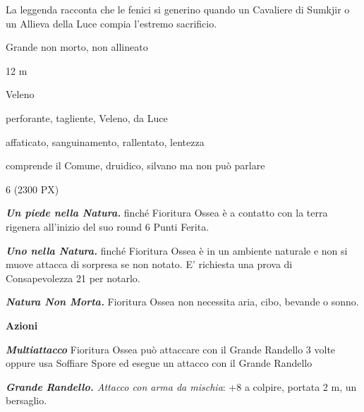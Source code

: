 \begin{multicols}{2}
{La leggenda racconta che le fenici si generino quando un Cavaliere di Sumkjir o un Allieva della Luce compia l'estremo sacrificio.

\begin{description}[noitemsep, topsep=0pt, parsep=0pt, partopsep=0pt, itemsep=1pt, leftmargin=2.35cm,  labelwidth=2.2cm, itemindent=0cm, listparindent=0pt] %
\setlength{\baselineskip}{10pt}
\item[\textbf{Taglia/Tipo}] Grande non morto, non allineato
\item[\textbf{Caratt.}] 
\item[\textbf{Punti Ferita}] 
\item[\textbf{Movimento}] 12 m
\item[\textbf{Tiri Salvez.}] 
\item[\textbf{Imm. Danni}] Veleno
\item[\textbf{Res. Danni}] perforante, tagliente, Veleno, da Luce
\item[\textbf{Immunità}] affaticato, sanguinamento, rallentato, lentezza
\item[\textbf{Sensi}] 
\item[\textbf{Linguaggi}] comprende il Comune, druidico, silvano ma non può parlare
\item[\textbf{Sfida}] 6 (2300 PX)
\end{description}
\smallskip

\emph{\textbf{Un piede nella Natura.}} finché Fioritura Ossea è a contatto con la terra rigenera all'inizio del suo round 6 Punti Ferita.

\emph{\textbf{Uno nella Natura.}} finché Fioritura Ossea è in un ambiente naturale e non si muove attacca di sorpresa se non notato. E' richiesta una prova di Consapevolezza 21 per notarlo.

\emph{\textbf{Natura Non Morta.}} Fioritura Ossea non necessita aria, cibo, bevande o sonno.

\textbf{Azioni}

\emph{\textbf{Multiattacco}} Fioritura Ossea può attaccare con il Grande Randello 3 volte oppure usa Soffiare Spore ed esegue un attacco con il Grande Randello

\emph{\textbf{Grande Randello.} Attacco con arma da mischia}: +8 a colpire, portata 2 m, un bersaglio.

}
\end{multicols}
